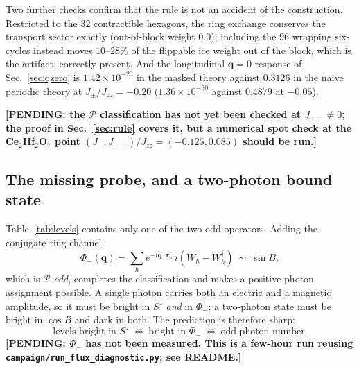 \documentclass[aps,prl,preprint,amsmath,amssymb,superscriptaddress,
longbibliography,floatfix]{revtex4-2}
\newcommand{\Jzz}{J_{zz}}
\newcommand{\Jpm}{J_{\pm}}
\newcommand{\Jpmpm}{J_{\pm\pm}}
\DeclareRobustCommand{\bq}{\bm q}
\DeclareRobustCommand{\br}{\bm r}
\newcommand{\PP}{\mathcal{P}}
\newcommand{\pending}[1]{{\color{red}\textbf{[PENDING: #1]}}}
\begin{document}
Two further checks confirm that the rule is not an accident of the
construction.  Restricted to the $32$ contractible hexagons, the ring exchange
conserves the transport sector exactly (out-of-block weight $0.0$); including
the $96$ wrapping six-cycles instead moves $10$--$28\%$ of the flippable ice
weight out of the block, which is the artifact, correctly present.  And the
longitudinal $\bq=0$ response of Sec.~\ref{sec:qzero} is $1.42\times10^{-29}$
in the masked theory against $0.3126$ in the naive periodic theory at
$\Jpm/\Jzz=-0.20$ ($1.36\times10^{-30}$ against $0.4879$ at $-0.05$).

\pending{the $\PP$ classification has not yet been checked at $\Jpmpm\neq0$;
the proof in Sec.~\ref{sec:rule} covers it, but a numerical spot check at the
Ce$_2$Hf$_2$O$_7$ point $(\Jpm,\Jpmpm)/\Jzz=(-0.125,0.085)$ should be run.}

\subsection{The missing probe, and a two-photon bound state}
\label{sec:sinB}

Table~\ref{tab:levels} contains only one of the two odd operators.  Adding the
conjugate ring channel
\begin{equation}
 \Phi_-(\bq)=\sum_he^{-i\bq\cdot\br_h}\,i\left(W_h-W_h^\dagger\right)
 \ \sim\ \sin B ,
 \label{eq:sinB}
\end{equation}
which is $\PP$-\emph{odd}, completes the classification and makes a positive
photon assignment possible.  A single photon carries both an electric and a
magnetic amplitude, so it must be bright in $S^z$ \emph{and} in $\Phi_-$; a
two-photon state must be bright in $\cos B$ and dark in both.  The prediction
is therefore sharp:
\begin{equation}
 \text{levels bright in } S^z \ \Longleftrightarrow\ \text{bright in }\Phi_-
 \ \Longleftrightarrow\ \text{odd photon number.}
 \label{eq:assign}
\end{equation}
\pending{$\Phi_-$ has not been measured.  This is a few-hour run reusing
\texttt{campaign/run\_flux\_diagnostic.py}; see README.}
\end{document}
